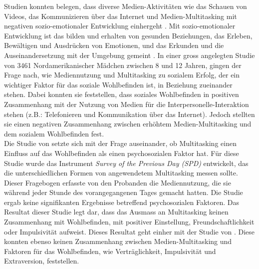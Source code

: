 Studien konnten belegen, dass diverse Medien-Aktivitäten wie das Schauen von Videos, das Kommunizieren über das Internet und Medien-Multitasking mit negativen sozio-emotionaler Entwicklung einhergeht \cite{Funk1996, Rideout2010, Pea2012}. Mit sozio-emotionaler Entwicklung ist das bilden und erhalten von gesunden Beziehungen, das Erleben, Bewältigen und Ausdrücken von Emotionen, und das Erkunden und die Auseinandersetzung mit der Umgebung gemeint \cite{Hymes1952, Lerner2000}. In einer gross angelegten Studie von 3461 Nordamerikanischer Mädchen zwischen 8 und 12 Jahren, gingen  der Frage nach, wie Mediennutzung und Multitasking zu sozialem Erfolg, der ein wichtiger Faktor für das soziale Wohlbefinden ist, in Beziehung zueinander stehen. Dabei konnten sie feststellen, dass soziales Wohlbefinden in positiven Zusammenhang mit der Nutzung von Medien für die Interpersonelle-Interaktion stehen (z.B.: Telefonieren und Kommunikation über das Internet). Jedoch stellten sie einen negativen Zusammenhang zwischen erhöhtem Medien-Multitasking und dem sozialem Wohlbefinden fest.\\
Die Studie von  setzte sich mit der Frage auseinander, ob Multitasking einen Einfluss auf das Wohlbefinden als einen psychosozialen Faktor hat. Für diese Studie wurde das Instrument \textit{Survey of the Previous Day (SPD)} entwickelt, das die unterschiedlichen Formen von angewendetem Multitasking messen sollte. Dieser Fragebogen erfasste von den Probanden die Mediennutzung, die sie während jeder Stunde des vorangegangenen Tages gemacht hatten. Die Studie ergab keine signifikanten Ergebnisse betreffend psychosozialen Faktoren. Das Resultat dieser Studie legt dar, dass das Ausmass an Multitasking keinen Zusammenhang mit Wohlbefinden, mit positiver Einstellung, Freundschaftlichkeit oder Impulsivität aufweist. Dieses Resultat geht einher mit der Studie von . Diese konnten ebenso keinen Zusammenhang zwischen Medien-Multitasking und Faktoren für das Wohlbefinden, wie Verträglichkeit, Impulsivität und Extraversion, feststellen.
